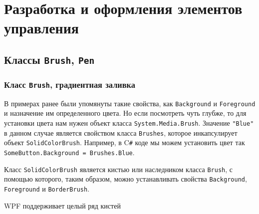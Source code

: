 \section{Разработка и оформления элементов управления}
\graphicspath{{parts/guides/3_controls/images/}}

\subsection{Классы \texttt{Brush}, \texttt{Pen}}

\subsubsection{Класс \texttt{Brush}, градиентная заливка}

В примерах ранее были упомянуты такие свойства, как \texttt{Background} и \texttt{Foreground} и назначение им определенного цвета. Но если посмотреть чуть глубже, то для установки цвета нам нужен объект класса \texttt{System.Media.Brush}. Значение \texttt{"Blue"} в данном случае является свойством класса \texttt{Brushes}, которое инкапсулирует объект \texttt{SolidColorBrush}. Например, в C\texttt{\#} коде мы можем установить цвет так \texttt{SomeButton.Background = Brushes.Blue}.

Класс \texttt{SolidColorBrush} является кистью или наследником класса \texttt{Brush}, с помощью которого, таким образом, можно устанавливать свойства \texttt{Background}, \texttt{Foreground} и \texttt{BorderBrush}.

WPF поддерживает целый ряд кистей

